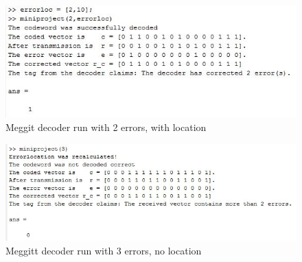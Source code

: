 \documentclass[Main]{subfiles}
\begin{document}
\begin{figure}[h!]
\centering
\includegraphics[width=0.7\linewidth]{./Picture/result-2-errors-location}
\caption{Meggit decoder run with 2 errors, with location}
\label{fig:result-2-errors-location}
\end{figure}

\begin{figure}[h!]
\centering
\includegraphics[width=0.7\linewidth]{./Picture/result-3-errors}
\caption{Meggitt decoder run with 3 errors, no location}
\label{fig:result-3-errors}
\end{figure}






\end{document}
